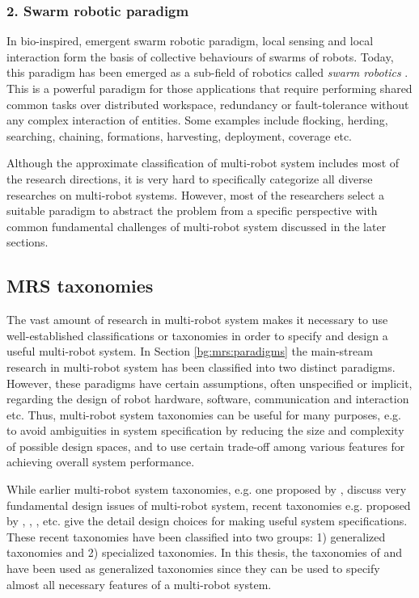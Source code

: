 \subsubsection*{2. Swarm robotic paradigm}
In bio-inspired, emergent swarm robotic paradigm, local sensing and local interaction form the basis of collective behaviours of swarms of robots. Today, this paradigm has been emerged as a sub-field of robotics called {\em swarm robotics} \cite{Sahin+2005}. This is a powerful paradigm for those applications that require performing shared common tasks over distributed workspace, redundancy or fault-tolerance without any complex interaction of entities. Some examples include flocking, herding, searching, chaining, formations, harvesting, deployment, coverage etc. 

Although the approximate classification of multi-robot system includes most of the research directions, it is very hard to specifically categorize all diverse researches on multi-robot systems. However, most of the researchers select a suitable paradigm to abstract the problem from a specific perspective with common fundamental challenges of multi-robot system discussed in the later sections.
\subsection{MRS taxonomies}
\label{bg:mrs:taxonomies}
The vast amount of research in multi-robot system makes it necessary to use well-established classifications or taxonomies in order to specify and design a useful multi-robot system. In Section \ref{bg:mrs:paradigms} the main-stream research in multi-robot system has been classified into two distinct paradigms. However, these paradigms have certain assumptions, often unspecified or implicit, regarding the design of robot hardware, software, communication and interaction etc. Thus, multi-robot system taxonomies can be useful for many purposes, e.g. to avoid ambiguities in system specification by reducing the size and complexity of possible design spaces, and to use certain trade-off among various features for achieving overall system performance.

While earlier multi-robot system taxonomies, e.g. one proposed by ,  discuss very fundamental design issues of multi-robot system, recent taxonomies e.g. proposed by , , ,  etc. give the detail design choices for making useful system specifications.  These recent taxonomies have been classified into two groups: 1) generalized taxonomies and 2) specialized taxonomies. In this thesis, the taxonomies of  and  have been used as generalized taxonomies since they  can be used to specify almost all necessary features of a multi-robot system.   

